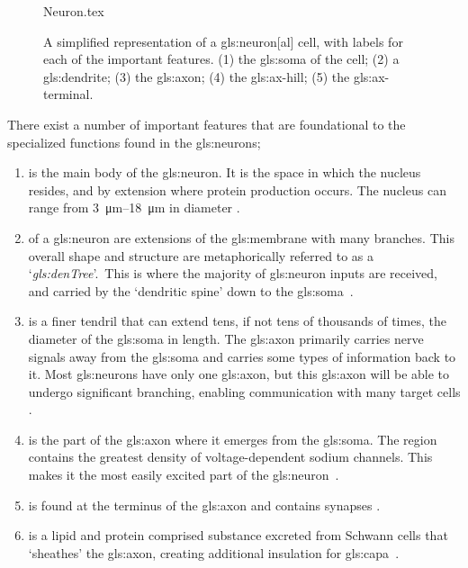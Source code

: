 \documentclass[class={myRUCProject}, crop=false]{standalone}
\begin{document}
\begin{figure}[H]
    \centering
    {Neuron.tex}
    \caption{A simplified representation of a \gls{gls:neuron}[al] cell, with labels for each of the important features. (1) the \gls{gls:soma} of the cell; (2) a \gls{gls:dendrite}; (3) the \gls{gls:axon}; (4) the \gls{gls:ax-hill}; (5) the \gls{gls:ax-terminal}.}\label{fig:Neuron}
\end{figure}

There exist a number of important features that are foundational to the specialized functions found in the \glspl{gls:neuron};\vspace{-2em}
\begin{enumerate}
  \item {} is the main body of the \gls{gls:neuron}. It is the space in which the nucleus resides, and by extension where protein production occurs. The nucleus can range from \qtyrange{3}{18}{\um} in diameter \cite{Hammond2015ch3,Hammond2015ch4}.
  \item {} of a \gls{gls:neuron} are extensions of the \gls{gls:membrane} with many branches. This overall shape and structure are metaphorically referred to as a `\textit{\gls{gls:denTree}}'.\footnotemark~This is where the majority of \gls{gls:neuron} inputs are received, and carried by the `dendritic spine' down to the \gls{gls:soma}~\cite{Hammond2015ch3,Hammond2015ch4}. 
  \item {} is a finer tendril that can extend tens, if not tens of thousands of times, the diameter of the \gls{gls:soma} in length. The \gls{gls:axon} primarily carries nerve signals away from the \gls{gls:soma} and carries some types of information back to it. Most \glspl{gls:neuron} have only one \gls{gls:axon}, but this \gls{gls:axon} will be able to undergo significant branching, enabling communication with many target cells \cite{Hammond2015ch3,Hammond2015ch4}. 
  \item {} is the part of the \gls{gls:axon} where it emerges from the \gls{gls:soma}. The region contains the greatest density of voltage-dependent sodium channels. This makes it the most easily excited part of the \gls{gls:neuron}~\cite{Hammond2015ch3,Hammond2015ch4}. 
  \item {} is found at the terminus of the \gls{gls:axon} and contains synapses \cite{Hammond2015ch3,Hammond2015ch4}. 
  \item {} is a lipid and protein comprised substance excreted from Schwann cells that `sheathes' the \gls{gls:axon}, creating additional insulation for \gls{gls:capa}~\cite{Hammond2015ch4}.
\end{enumerate}
\end{document}
